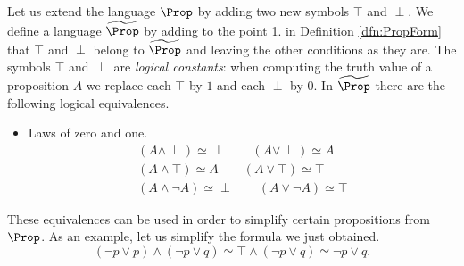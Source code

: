 Let us extend the language $\Prop$ by adding two new symbols $\top$ and $\perp$.
We define a language $\widetilde{\Prop}$ by adding to the point 1. in Definition \ref{dfn:PropForm} that $\top$ and $\perp$ belong to $\widetilde{\Prop}$
and leaving the other conditions as they are.
The symbols $\top$ and $\perp$ are \emph{logical constants}: when computing the truth value of a proposition $A$
we replace each $\top$ by $1$ and each $\perp$ by $0$.
In $\widetilde{\Prop}$ there are the following logical equivalences.
\begin{itemize}
\item
Laws of zero and one.
\begin{gather*}
(A \wedge \perp) \simeq \perp \qquad (A \vee \perp) \simeq A\\
(A \wedge \top) \simeq A \qquad (A \vee \top) \simeq \top\\
(A \wedge \neg A) \simeq \perp \qquad (A \vee \neg A) \simeq \top
\end{gather*}
\end{itemize}

These equivalences can be used in order to simplify certain propositions from $\Prop$.
As an example, let us simplify the formula we just obtained.
\[
(\neg p \vee p) \wedge (\neg p \vee q) \simeq \top \wedge (\neg p \vee q) \simeq \neg p \vee q.
\]




